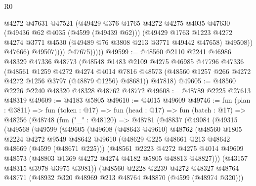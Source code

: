 \begin{lexlean}{R0}
\begin{coremodule}
                        @4272
                        @47631
                        @47521
                        (@49429
                          @376
                          @1765
                          @4272
                          @4275
                          @4035
                          @47630
                          (@49436 @62 @4035 (@4599 (@49439 @62)))
                          (@49429
                            @1763
                            @1223
                            @4272
                            @4274
                            @3771
                            @4530
                            (@49489 @76 @3808 @213 @3771 @49442 @47658)
                            @49508))
                        @47666)
                      @49507))))
              @47675)))))
@49599 := @48560
    @2110
    @2241
    @46986
    @48329
    @47336
    @48773
    (@48548
      @1483
      @2109
      @4275
      @46985
      @47796
      @47336
      (@48561
        @1259
        @4272
        @4274
        @4014
        @7816
        @48573
        (@48560 @1257 @266 @4272 @4272 @1256 @3797 (@48879 @1256) @48681))
      @47818)
@49605 := @48560 @2226 @2240 @48320 @48328 @48762 @48772
@49608 := @48789 @2225 @27613 @48319
@49609 := @4183 @5805
@49610 := @4015 @49609
@49746 := fun (plan : @3811) =>
  fun (token : @17) =>
  fun (head : @17) =>
  fun (batch : @17) =>
  @48256
    (@48748
      (fun ("_" : @48120) =>
      @48781
        (@48837
          (@49084
            (@49315
              (@49568
                (@49599
                  (@49605
                    (@49608
                      (@48643 @49610)
                      @48762
                      (@48560
                        @1805
                        @2224
                        @4272
                        @9549
                        @48642
                        @49610
                        (@48629 @225 @48661 @213 @48642 @48669 (@4599 (@48671 @225)))
                        (@48561
                          @2223
                          @4272
                          @4275
                          @4014
                          @49609
                          @48573
                          (@48803 @1369 @4272 @4274 @4182 @5805 @48813 @48827)))
                      (@43157 @48315 @3978 @3975 @3981))
                    (@48560
                      @2228
                      @2239
                      @4272
                      @48327
                      @48764
                      @48771
                      (@48932 @320 @48969 @213 @48764 @48870 (@4599 (@48974 @320)))

\end{coremodule}
\end{lexlean}
